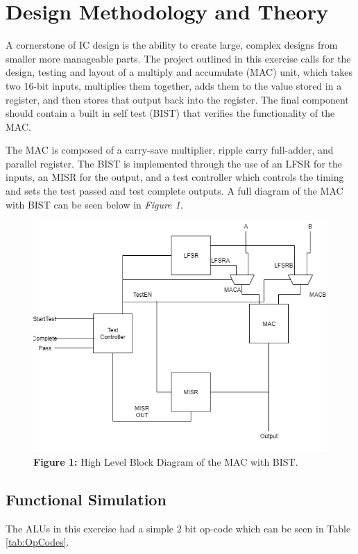 \documentclass[11pt]{article}
\begin{document}
\section{Design Methodology and Theory}

	A cornerstone of IC design is the ability to create large, complex designs from smaller more manageable parts. The project outlined in this exercise calls for the design, testing and layout of a multiply and accumulate (MAC) unit, which takes two 16-bit inputs, multiplies them together, adds them to the value stored in a register, and then stores that output back into the register. The final component should contain a built in self test (BIST) that verifies the functionality of the MAC.
	
	The MAC is composed of a carry-save multiplier, ripple carry full-adder, and parallel register. The BIST is implemented through the use of an LFSR for the inputs, an MISR for the output, and a test controller which controls the timing and sets the test passed and test complete outputs. A full diagram of the MAC with BIST can be seen below in \textit{Figure 1}.
	
	\begin{figure}
		\centering
		\includegraphics[width=0.7\linewidth]{Report/Pictures/Full-Project-Block}
		\caption{\textbf{Figure 1: } High Level Block Diagram of the MAC with BIST.}
		\label{fig:full-project-block}
	\end{figure}
	

	\subsection{Functional Simulation}
	

		The ALUs in this exercise had a simple 2 bit op-code which can be seen in Table \ref{tab:OpCodes}.
	
\end{document}
